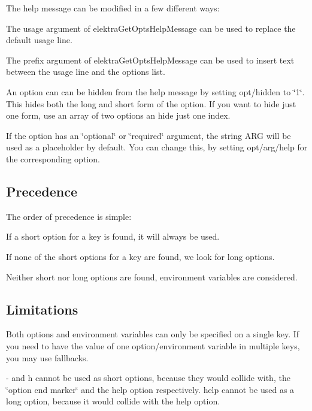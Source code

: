 The help message can be modified in a few different ways\+:


\begin{DoxyItemize}
\item The {\ttfamily usage} argument of {\ttfamily elektra\+Get\+Opts\+Help\+Message} can be used to replace the default usage line.
\item The {\ttfamily prefix} argument of {\ttfamily elektra\+Get\+Opts\+Help\+Message} can be used to insert text between the usage line and the options list.
\item An option can can be hidden from the help message by setting {\ttfamily opt/hidden} to {\ttfamily \char`\"{}1\char`\"{}}. This hides both the long and short form of the option. If you want to hide just one form, use an array of two options an hide just one index.
\item If the option has an {\ttfamily \char`\"{}optional\char`\"{}} or {\ttfamily \char`\"{}required\char`\"{}} argument, the string {\ttfamily A\+RG} will be used as a placeholder by default. You can change this, by setting {\ttfamily opt/arg/help} for the corresponding option.
\end{DoxyItemize}

\subsection*{Precedence}

The order of precedence is simple\+:


\begin{DoxyItemize}
\item If a short option for a key is found, it will always be used.
\item If none of the short options for a key are found, we look for long options.
\item Neither short nor long options are found, environment variables are considered.
\end{DoxyItemize}

\subsection*{Limitations}


\begin{DoxyItemize}
\item Both options and environment variables can only be specified on a single key. If you need to have the value of one option/environment variable in multiple keys, you may use {\ttfamily fallback}s.
\item {\ttfamily -\/} and {\ttfamily h} cannot be used as short options, because they would collide with, the \char`\"{}option end marker\char`\"{} and the help option respectively. {\ttfamily help} cannot be used as a long option, because it would collide with the help option.
\end{DoxyItemize}

